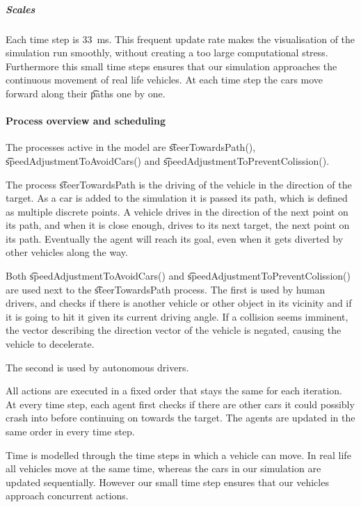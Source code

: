 	\subparagraph{Scales}
	Each time step is \si{33 \milli\second}. This frequent update rate makes the visualisation of the simulation run smoothly, without creating a too large computational stress. Furthermore this small time steps ensures that our simulation approaches the continuous movement of real life vehicles. 
	At each time step the cars move forward along their \t{paths} one by one. 





\paragraph{Process overview and scheduling}
\label{par:method:model:overview:process}


The processes active in the model are \t{steerTowardsPath()}, \t{speedAdjustmentToAvoidCars()} and \t{speedAdjustmentToPreventColission()}. 

The process \t{steerTowardsPath} is the driving of the vehicle in the direction of the target. As a car is added to the simulation it is passed its path, which is defined as multiple discrete points.  A vehicle drives in the direction of the next point on its path, and when it is close enough, drives to its next target, the next point on its path. Eventually the agent will reach its goal, even when it gets diverted by other vehicles along the way.

Both \t{speedAdjustmentToAvoidCars()} and \t{speedAdjustmentToPreventColission()} are used next to the \t{steerTowardsPath} process. The first is used by human drivers, and checks if there is another vehicle or other object in its vicinity and if it is going to hit it given its current driving angle. If a collision seems imminent, the vector describing the direction vector of the vehicle is negated, causing the vehicle to decelerate.

The second is used by autonomous drivers. 


All actions are executed in a fixed order that stays the same for each iteration. At every time step, each agent first checks if there are other cars it could possibly crash into before continuing on towards the target. The agents are updated in the same order in every time step.

Time is modelled through the time steps in which a vehicle can move. In real life all vehicles move at the same time, whereas the cars in our simulation are updated sequentially. However our small time step ensures that our vehicles approach concurrent actions. 


